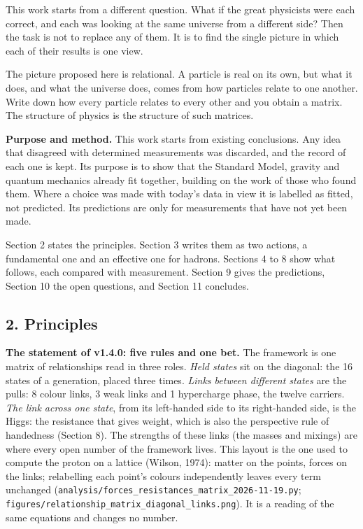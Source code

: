 \documentclass[
  11pt,
]{article}
\begin{document}
This work starts from a different question. What if the great physicists were each correct, and each was looking at the same universe from a different side? Then the task is not to replace any of them. It is to find the single picture in which each of their results is one view.

The picture proposed here is relational. A particle is real on its own, but what it does, and what the universe does, comes from how particles relate to one another. Write down how every particle relates to every other and you obtain a matrix. The structure of physics is the structure of such matrices.

\textbf{Purpose and method.} This work starts from existing conclusions. Any idea that disagreed with determined measurements was discarded, and the record of each one is kept. Its purpose is to show that the Standard Model, gravity and quantum mechanics already fit together, building on the work of those who found them. Where a choice was made with today's data in view it is labelled as fitted, not predicted. Its predictions are only for measurements that have not yet been made.

Section 2 states the principles. Section 3 writes them as two actions, a fundamental one and an effective one for hadrons. Sections 4 to 8 show what follows, each compared with measurement. Section 9 gives the predictions, Section 10 the open questions, and Section 11 concludes.

\hypertarget{principles}{%
\subsection{2. Principles}\label{principles}}

\textbf{The statement of v1.4.0: five rules and one bet.} The framework is one matrix of relationships read in three roles. \emph{Held states} sit on the diagonal: the 16 states of a generation, placed three times. \emph{Links between different states} are the pulls: 8 colour links, 3 weak links and 1 hypercharge phase, the twelve carriers. \emph{The link across one state}, from its left-handed side to its right-handed side, is the Higgs: the resistance that gives weight, which is also the perspective rule of handedness (Section 8). The strengths of these links (the masses and mixings) are where every open number of the framework lives. This layout is the one used to compute the proton on a lattice (Wilson, 1974): matter on the points, forces on the links; relabelling each point's colours independently leaves every term unchanged (\texttt{analysis/forces\_resistances\_matrix\_2026-11-19.py}; \texttt{figures/relationship\_matrix\_diagonal\_links.png}). It is a reading of the same equations and changes no number.
\end{document}
